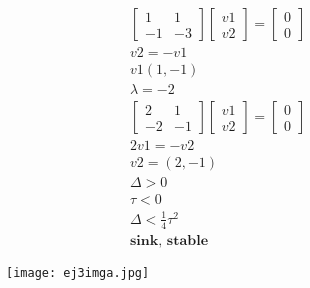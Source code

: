 \documentclass[a4paper,10pt]{article}
\begin{document}
\begin{enumerate}
\begin{enumerate}
\begin{equation}
\begin{aligned}
\begin{bmatrix}
                            1 &1\\
                            -1&-3
                        \end{bmatrix}
                        \begin{bmatrix}
                            v1\\
                            v2
                        \end{bmatrix}
                        =
                        \begin{bmatrix}
                            0\\
                            0
                        \end{bmatrix}\\
                        v2=-v1\\
                        v1(1,-1)\\
                        \lambda= -2\\
                        \begin{bmatrix}
                            2 &1\\
                            -2&-1
                        \end{bmatrix}
                        \begin{bmatrix}
                            v1\\
                            v2
                        \end{bmatrix}
                        =
                        \begin{bmatrix}
                            0\\
                            0
                        \end{bmatrix}\\
                        2v1=-v2\\
                        v2=(2,-1)\\
                        \Delta>0\\
                        \tau<0\\
                        \Delta <\frac{1}{4}\tau^{2}\\
                        \textbf{sink, stable}
                    \end{aligned}
                \end{equation}
                \newpage
                \begin{figure}[h]
                    \centering
                    \texttt{[image: ej3imga.jpg]}

\end{figure}
\end{enumerate}
\end{enumerate}
\end{document}
